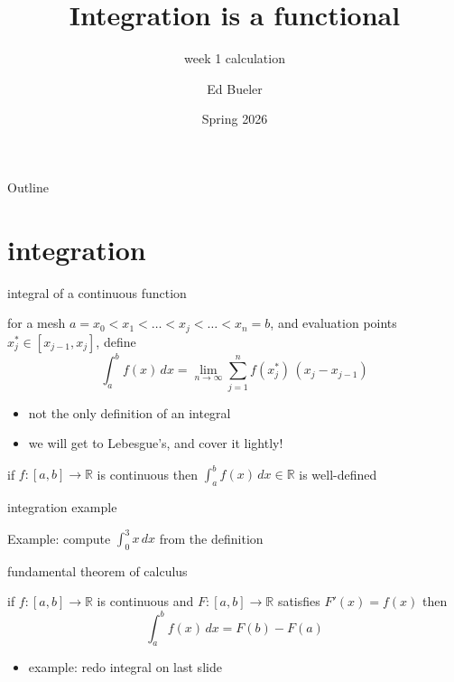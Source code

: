 \documentclass[10pt,
               svgnames,
               hyperref={colorlinks,citecolor=DeepPink4,linkcolor=FireBrick,urlcolor=Maroon},
               usepdftitle=false]{beamer}
\title{Integration is a functional}
\subtitle{week 1 calculation}
\author{Ed Bueler}
\institute[]{UAF Math 617 Functional Analysis}
\date{Spring 2026}
\newcommand{\RR}{\mathbb{R}}
\begin{document}
\beamertemplatenavigationsymbolsempty

\begin{frame}
  \maketitle
\end{frame}

\begin{frame}{Outline}
  \tableofcontents[hideallsubsections]
\end{frame}

\AtBeginSection[]
{%
}

\section{integration}


\begin{frame}{integral of a continuous function}

\begin{definition}
for a mesh $a = x_0 < x_1 < \dots < x_j < \dots < x_n = b$, and evaluation points $x_j^* \in [x_{j-1},x_j]$, define
  $$\int_a^b f(x)\,dx = \lim_{n\to\infty} \sum_{j=1}^n f(x_j^*)\,(x_j - x_{j-1})$$ 
\end{definition}

\begin{itemize}
\item not the only definition of an integral
\item we will get to Lebesgue's, and cover it lightly!
\end{itemize}

\begin{theorem}
if $f:[a,b] \to \RR$ is continuous then $\int_a^b f(x)\,dx \in \RR$ is well-defined
\end{theorem}
\end{frame}


\begin{frame}{integration example}

Example: compute $\int_0^3 x\, dx$ from the definition

\vspace{60mm}
\end{frame}


\begin{frame}{fundamental theorem of calculus}

\begin{theorem}
if $f:[a,b] \to \RR$ is continuous and $F:[a,b]\to \RR$ satisfies $F'(x)=f(x)$ then
    $$\int_a^b f(x)\, dx = F(b) - F(a)$$
\end{theorem}

\begin{itemize}
\item example: redo integral on last slide

\vspace{30mm}
\end{itemize}

\end{frame}
\end{document}
